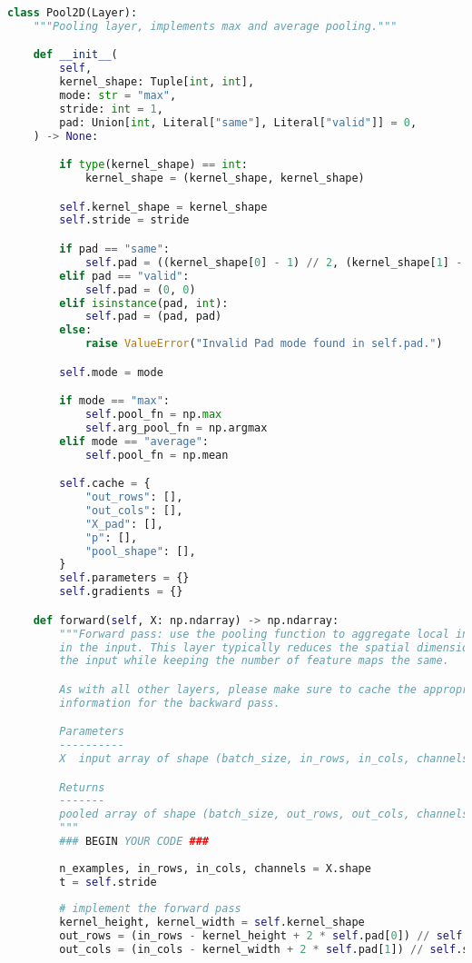 \begin{lstlisting}[language=Python]
class Pool2D(Layer):
    """Pooling layer, implements max and average pooling."""

    def __init__(
        self,
        kernel_shape: Tuple[int, int],
        mode: str = "max",
        stride: int = 1,
        pad: Union[int, Literal["same"], Literal["valid"]] = 0,
    ) -> None:

        if type(kernel_shape) == int:
            kernel_shape = (kernel_shape, kernel_shape)

        self.kernel_shape = kernel_shape
        self.stride = stride

        if pad == "same":
            self.pad = ((kernel_shape[0] - 1) // 2, (kernel_shape[1] - 1) // 2)
        elif pad == "valid":
            self.pad = (0, 0)
        elif isinstance(pad, int):
            self.pad = (pad, pad)
        else:
            raise ValueError("Invalid Pad mode found in self.pad.")

        self.mode = mode

        if mode == "max":
            self.pool_fn = np.max
            self.arg_pool_fn = np.argmax
        elif mode == "average":
            self.pool_fn = np.mean

        self.cache = {
            "out_rows": [],
            "out_cols": [],
            "X_pad": [],
            "p": [],
            "pool_shape": [],
        }
        self.parameters = {}
        self.gradients = {}

    def forward(self, X: np.ndarray) -> np.ndarray:
        """Forward pass: use the pooling function to aggregate local information
        in the input. This layer typically reduces the spatial dimensionality of
        the input while keeping the number of feature maps the same.

        As with all other layers, please make sure to cache the appropriate
        information for the backward pass.

        Parameters
        ----------
        X  input array of shape (batch_size, in_rows, in_cols, channels)

        Returns
        -------
        pooled array of shape (batch_size, out_rows, out_cols, channels)
        """
        ### BEGIN YOUR CODE ###
        
        n_examples, in_rows, in_cols, channels = X.shape
        t = self.stride
        
        # implement the forward pass
        kernel_height, kernel_width = self.kernel_shape
        out_rows = (in_rows - kernel_height + 2 * self.pad[0]) // self.stride + 1
        out_cols = (in_cols - kernel_width + 2 * self.pad[1]) // self.stride + 1
        

\end{lstlisting}
